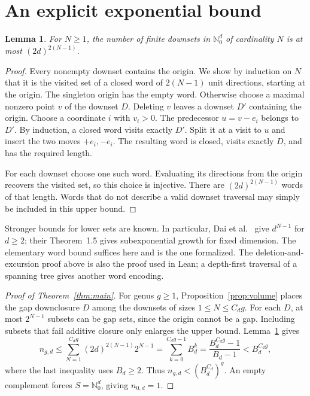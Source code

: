 \documentclass[11pt]{article}
\newtheorem{lemma}[theorem]{Lemma}
\theoremstyle{remark}
\newcommand{\N}{\mathbb N_0}
\begin{document}
\newpage
\section{An explicit exponential bound}
\begin{lemma}\label{lem:walk}
For $N\ge1$, the number of finite downsets in $\N^d$ of cardinality $N$
is at most $(2d)^{2(N-1)}$.
\end{lemma}
\begin{proof}
Every nonempty downset contains the origin. We show by induction on $N$
that it is the visited set of a closed word of $2(N-1)$ unit directions,
starting at the origin. The singleton origin has the empty word. Otherwise
choose a maximal nonzero point $v$ of the downset $D$. Deleting $v$
leaves a downset $D'$ containing the origin. Choose a coordinate $i$
with $v_i>0$. The predecessor $u=v-e_i$ belongs to $D'$. By induction,
a closed word visits exactly $D'$. Split it at a visit to $u$ and insert
the two moves $+e_i,-e_i$. The resulting word is closed, visits exactly
$D$, and has the required length.

For each downset choose one such word. Evaluating its directions from
the origin recovers the visited set, so this choice is injective. There
are $(2d)^{2(N-1)}$ words of that length. Words that do not describe a
valid downset traversal may simply be included in this upper bound.
\end{proof}

Stronger bounds for lower sets are known. In particular,
Dai et al.~\cite[Theorem~1.4]{DPSTT} give $d^{N-1}$ for $d\ge2$;
their Theorem~1.5 gives subexponential growth for fixed dimension.
The elementary word bound suffices here and is the one formalized.
The deletion-and-excursion proof above is also the proof used in Lean;
a depth-first traversal of a spanning tree gives another word encoding.

\begin{proof}[Proof of Theorem~\ref{thm:main}]
For genus $g\ge1$, Proposition~\ref{prop:volume} places the gap
downclosure $D$ among the downsets of sizes $1\le N\le C_dg$.
For each $D$, at most $2^{N-1}$ subsets can be gap sets, since the
origin cannot be a gap. Including subsets that fail additive closure
only enlarges the upper bound. Lemma~\ref{lem:walk} gives
\[
 n_{g,d}\le\sum_{N=1}^{C_dg}(2d)^{2(N-1)}2^{N-1}
 =\sum_{k=0}^{C_dg-1}B_d^k
 =\frac{B_d^{C_dg}-1}{B_d-1}<B_d^{C_dg},
\]
where the last inequality uses $B_d\ge2$. Thus
$n_{g,d}<(B_d^{C_d})^g$. An empty complement forces $S=\N^d$,
giving $n_{0,d}=1$.
\end{proof}
\end{document}
